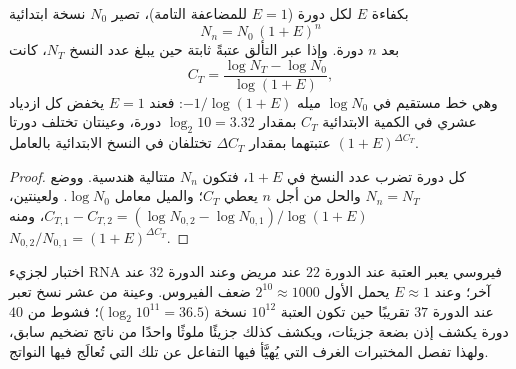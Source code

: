 \begin{theorem}\label{thm:b3:genetic-engineering:pcr}
بكفاءة $E$ لكل دورة ($E = 1$ للمضاعفة التامة)، تصير $N_{0}$
نسخة ابتدائية
\[
N_{n} = N_{0}\,(1 + E)^{n}
\]
بعد $n$ دورة. وإذا عبر التألق عتبةً ثابتة حين
يبلغ عدد النسخ $N_{T}$، كانت \emph{}
\[
C_{T} = \frac{\log N_{T} - \log N_{0}}{\log(1 + E)},
\]
وهي خط مستقيم في $\log N_{0}$ ميله $-1/\log(1+E)$: فعند $E = 1$
يخفض كل ازدياد عشري في الكمية الابتدائية $C_{T}$ بمقدار
$\log_{2} 10 = 3.32$ دورة، وعينتان تختلف دورتا عتبتهما
بمقدار $\Delta C_{T}$ تختلفان في النسخ الابتدائية بالعامل
$(1 + E)^{\Delta C_{T}}$.
\end{theorem}
\begin{proof}
كل دورة تضرب عدد النسخ في $1 + E$، فتكون $N_{n}$
متتالية هندسية. ووضع $N_{n} = N_{T}$ والحل من أجل $n$ يعطي
$C_{T}$؛ والميل معامل $\log N_{0}$. ولعينتين،
$C_{T,1} - C_{T,2} = (\log N_{0,2} - \log N_{0,1})/\log(1+E)$، ومنه
$N_{0,2}/N_{0,1} = (1+E)^{\Delta C_{T}}$.
\end{proof}

\begin{example}\label{ex:b3:genetic-engineering:qpcr}
اختبار لجزيء RNA فيروسي يعبر العتبة عند الدورة $22$ عند مريض
وعند الدورة $32$ عند آخر؛ وعند $E \approx 1$ يحمل الأول $2^{10}
\approx 1000$ ضعف الفيروس. وعينة من عشر نسخ تعبر عند
الدورة $37$ تقريبًا حين تكون العتبة $10^{12}$ نسخة ($\log_{2} 10^{11} =
36.5$)؛ فشوط من $40$ دورة يكشف إذن بضعة جزيئات، ويكشف
كذلك جزيئًا ملوثًا واحدًا من ناتج تضخيم سابق، ولهذا
تفصل المختبرات الغرف التي يُهيَّأ فيها التفاعل عن تلك التي
تُعالَج فيها النواتج.
\end{example}

